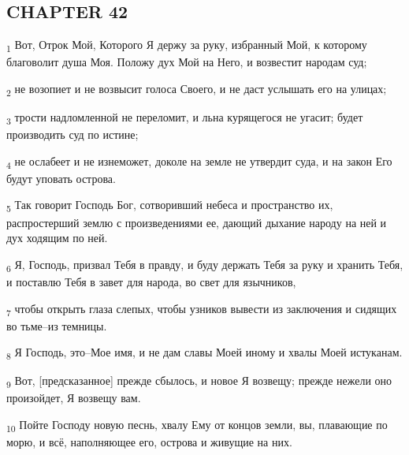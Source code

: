 \subsection{CHAPTER 42}
\begin{tcolorbox}
\textsubscript{1} Вот, Отрок Мой, Которого Я держу за руку, избранный Мой, к которому благоволит душа Моя. Положу дух Мой на Него, и возвестит народам суд;
\end{tcolorbox}
\begin{tcolorbox}
\textsubscript{2} не возопиет и не возвысит голоса Своего, и не даст услышать его на улицах;
\end{tcolorbox}
\begin{tcolorbox}
\textsubscript{3} трости надломленной не переломит, и льна курящегося не угасит; будет производить суд по истине;
\end{tcolorbox}
\begin{tcolorbox}
\textsubscript{4} не ослабеет и не изнеможет, доколе на земле не утвердит суда, и на закон Его будут уповать острова.
\end{tcolorbox}
\begin{tcolorbox}
\textsubscript{5} Так говорит Господь Бог, сотворивший небеса и пространство их, распростерший землю с произведениями ее, дающий дыхание народу на ней и дух ходящим по ней.
\end{tcolorbox}
\begin{tcolorbox}
\textsubscript{6} Я, Господь, призвал Тебя в правду, и буду держать Тебя за руку и хранить Тебя, и поставлю Тебя в завет для народа, во свет для язычников,
\end{tcolorbox}
\begin{tcolorbox}
\textsubscript{7} чтобы открыть глаза слепых, чтобы узников вывести из заключения и сидящих во тьме--из темницы.
\end{tcolorbox}
\begin{tcolorbox}
\textsubscript{8} Я Господь, это--Мое имя, и не дам славы Моей иному и хвалы Моей истуканам.
\end{tcolorbox}
\begin{tcolorbox}
\textsubscript{9} Вот, [предсказанное] прежде сбылось, и новое Я возвещу; прежде нежели оно произойдет, Я возвещу вам.
\end{tcolorbox}
\begin{tcolorbox}
\textsubscript{10} Пойте Господу новую песнь, хвалу Ему от концов земли, вы, плавающие по морю, и всё, наполняющее его, острова и живущие на них.
\end{tcolorbox}
